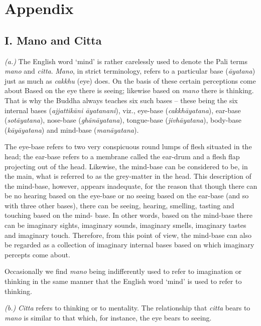 \chapter{Appendix}

\hypertarget{_i_mano_and_citta}{%
\section{I. Mano and Citta}\label{_i_mano_and_citta}}

\emph{(a.)} The English word `mind' is rather carelessly used to denote the Pali terms \textit{mano} and \textit{citta}. \textit{Mano}, in strict terminology, refers to a particular base (\textit{āyatana}) just as much as \textit{cakkhu} (eye) does. On the basis of these certain perceptions come about Based on the eye there is seeing; likewise based on \textit{mano} there is thinking. That is why the Buddha always teaches six such bases -- these being the six internal bases (\textit{ajjattikāni āyatanani}), viz., eye-base (\textit{cakkhāyatana}), ear-base (\textit{sotāyatana}), nose-base (\textit{ghānāyatana}), tongue-base (\textit{jivhāyatana}), body-base (\textit{kāyāyatana}) and mind-base (\textit{manāyatana}).

The eye-base refers to two very conspicuous round lumps of flesh situated in the head; the ear-base refers to a membrane called the ear-drum and a flesh flap projecting out of the head. Likewise, the mind-base can be considered to be, in the main, what is referred to as the grey-matter in the head. This description of the mind-base, however, appears inadequate, for the reason that though there can be no hearing based on the eye-base or no seeing based on the ear-base (and so with three other bases), there can be seeing, hearing, smelling, tasting and touching based on the mind- base. In other words, based on the mind-base there can be imaginary sights, imaginary sounds, imaginary smells, imaginary tastes and imaginary touch. Therefore, from this point of view, the mind-base can also be regarded as a collection of imaginary internal bases based on which imaginary percepts come about.

Occasionally we find \textit{mano} being indifferently used to refer to imagination or thinking in the same manner that the English word `mind' is used to refer to thinking.

\emph{(b.)} \textit{Citta} refers to thinking or to mentality. The relationship that \textit{citta} bears to \textit{mano} is similar to that which, for instance, the eye bears to seeing.

